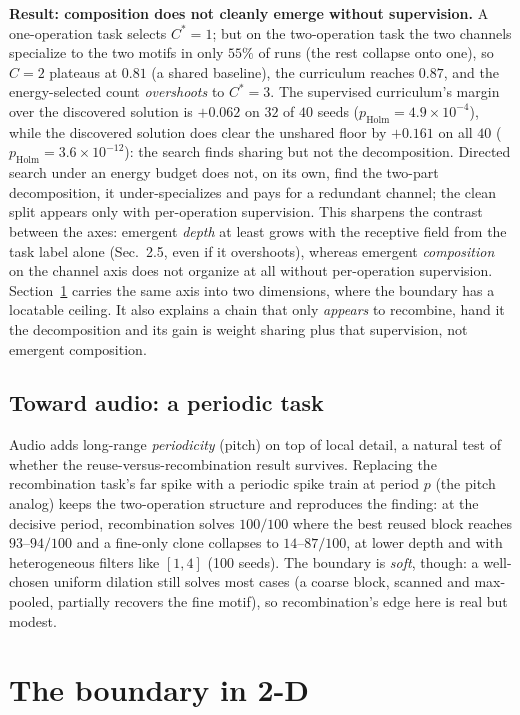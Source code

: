 \documentclass[11pt]{article}
\begin{document}
\textbf{Result: composition does not cleanly emerge without supervision.} A one-operation task selects
$C^\ast{=}1$; but on the two-operation task the two channels specialize to the two motifs in only $55\%$ of
runs (the rest collapse onto one), so $C{=}2$ plateaus at $0.81$ (a shared baseline), the curriculum
reaches $0.87$, and the energy-selected count \emph{overshoots} to $C^\ast{=}3$. The supervised
curriculum's margin over the discovered solution is $+0.062$ on $32$ of $40$ seeds
($p_{\mathrm{Holm}}{=}4.9{\times}10^{-4}$), while the discovered solution does clear the unshared floor
by $+0.161$ on all $40$ ($p_{\mathrm{Holm}}{=}3.6{\times}10^{-12}$): the search finds sharing but not the
decomposition. Directed search under an
energy budget does not, on its own, find the two-part decomposition, it under-specializes and pays for a
redundant channel; the clean split appears only with per-operation supervision. This sharpens the contrast
between the axes: emergent \emph{depth} at least grows with the receptive field from the task label alone
(Sec.~2.5, even if it overshoots), whereas emergent \emph{composition} on the channel axis does not
organize at all without per-operation supervision. Section~\ref{sec:twod} carries the same axis into two dimensions, where the boundary has a
locatable ceiling. It also explains a chain
that only \emph{appears} to recombine, hand it the decomposition and its gain is weight sharing plus that
supervision, not emergent composition.

\subsection{Toward audio: a periodic task}\label{subsec:audio}

Audio adds long-range \emph{periodicity} (pitch) on top of local detail, a natural test of whether the
reuse-versus-recombination result survives. Replacing the recombination task's far spike with a periodic
spike train at period $p$ (the pitch analog) keeps the two-operation structure and reproduces the finding: at the decisive
period, recombination solves $100/100$ where the best reused block reaches $93$--$94/100$ and a fine-only
clone collapses to $14$--$87/100$, at lower depth and with heterogeneous filters like $[1,4]$ (100 seeds).
The boundary is \emph{soft}, though: a well-chosen uniform dilation still solves most cases (a coarse block,
scanned and max-pooled, partially recovers the fine motif), so recombination's edge here is real but modest.

\section{The boundary in 2-D}\label{sec:twod}
\end{document}
